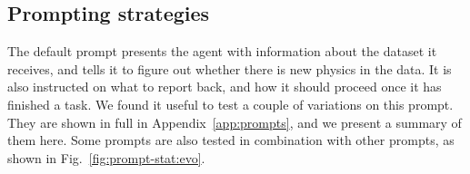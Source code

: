 \documentclass[submission, Phys]{SciPost}
\begin{document}

\subsection{Prompting strategies}
\label{sec:prompting_strategies}
The default prompt presents the agent with information about the dataset it receives, and tells it to figure out whether there is new physics in the data. It is also instructed on what to report back, and how it should proceed once it has finished a task. We found it useful to test a couple of variations on this prompt. They are shown in full in Appendix~\ref{app:prompts}, and we present a summary of them here. Some prompts are also tested in combination with other prompts, as shown in Fig.~\ref{fig:prompt-stat:evo}.
\end{document}
